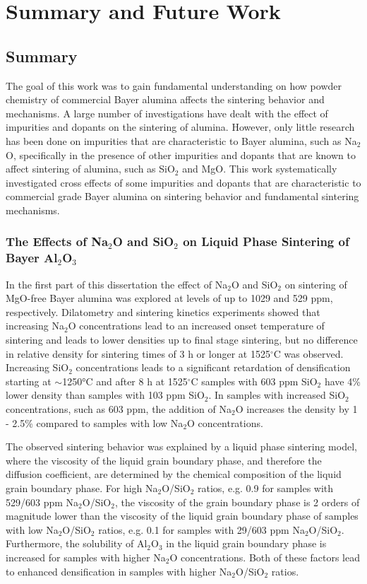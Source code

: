 \chapter{Summary and Future Work}

\section{Summary}
The goal of this work was to gain fundamental understanding on how powder chemistry of commercial Bayer alumina affects the sintering behavior and mechanisms. A large number of investigations have dealt with the effect of impurities and dopants on the sintering of alumina. However, only little research has been done on impurities that are characteristic to Bayer alumina, such as Na$_{2}$O, specifically in the presence of other impurities and dopants that are known to affect sintering of alumina, such as SiO$_{2}$ and MgO. This work systematically investigated cross effects of some impurities and dopants that are characteristic to commercial grade Bayer alumina on sintering behavior and fundamental sintering mechanisms. 

\subsection{The Effects of Na$_{2}$O and SiO$_{2}$ on Liquid Phase Sintering of Bayer Al$_{2}$O$_{3}$}
In the first part of this dissertation the effect of Na$_{2}$O and SiO$_{2}$ on sintering of MgO-free Bayer alumina was explored at levels of up to 1029 and 529 ppm, respectively. Dilatometry and sintering kinetics experiments showed that increasing Na$_{2}$O concentrations lead to an increased onset temperature of sintering and leads to lower densities up to final stage sintering, but no difference in relative density for sintering times of 3 h or longer at 1525$^{\circ}$C was observed. Increasing SiO$_{2}$ concentrations leads to a significant retardation of densification starting at $\sim$1250°C and after 8 h at 1525$^{\circ}$C samples with 603 ppm SiO$_{2}$ have 4\% lower density than samples with 103 ppm SiO$_{2}$. In samples with increased SiO$_{2}$ concentrations, such as 603 ppm, the addition of Na$_{2}$O increases the density by 1 - 2.5\% compared to samples with low Na$_{2}$O concentrations. 

The observed sintering behavior was explained by a liquid phase sintering model, where the viscosity of the liquid grain boundary phase, and therefore the diffusion coefficient, are determined by the chemical composition of the liquid grain boundary phase. For high Na$_{2}$O/SiO$_{2}$ ratios, e.g. 0.9 for samples with 529/603 ppm Na$_{2}$O/SiO$_{2}$, the viscosity of the grain boundary phase is 2 orders of magnitude lower than the viscosity of the liquid grain boundary phase of samples with low Na$_{2}$O/SiO$_{2}$ ratios, e.g. 0.1 for samples with 29/603 ppm Na$_{2}$O/SiO$_{2}$. Furthermore, the solubility of Al$_{2}$O$_{3}$ in the liquid grain boundary phase is increased for samples with higher Na$_{2}$O concentrations. Both of these factors lead to enhanced densification in samples with higher Na$_{2}$O/SiO$_{2}$ ratios. 

